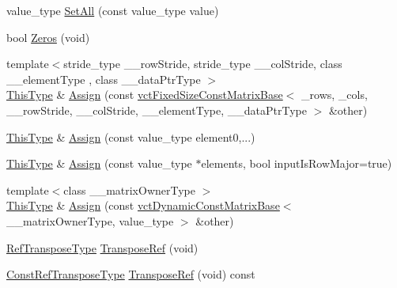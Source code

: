 \begin{DoxyCompactItemize}
\item 
value\-\_\-type \hyperlink{classvct_fixed_size_matrix_base_af32801fac5457ee53971dd5732aaaf30}{Set\-All} (const value\-\_\-type value)
\item 
bool \hyperlink{classvct_fixed_size_matrix_base_a28dd9c3f149dbd21dc91943fb51d88f0}{Zeros} (void)
\item 
{\footnotesize template$<$stride\-\_\-type \-\_\-\-\_\-row\-Stride, stride\-\_\-type \-\_\-\-\_\-col\-Stride, class \-\_\-\-\_\-element\-Type , class \-\_\-\-\_\-data\-Ptr\-Type $>$ }\\\hyperlink{classvct_fixed_size_const_matrix_base_a7ec66a96ed7e08ce9ff54093133c9d8d}{This\-Type} \& \hyperlink{classvct_fixed_size_matrix_base_a1bf6174aa97f71d7d33df7a92a368683}{Assign} (const \hyperlink{classvct_fixed_size_const_matrix_base}{vct\-Fixed\-Size\-Const\-Matrix\-Base}$<$ \-\_\-rows, \-\_\-cols, \-\_\-\-\_\-row\-Stride, \-\_\-\-\_\-col\-Stride, \-\_\-\-\_\-element\-Type, \-\_\-\-\_\-data\-Ptr\-Type $>$ \&other)
\item 
\hyperlink{classvct_fixed_size_const_matrix_base_a7ec66a96ed7e08ce9ff54093133c9d8d}{This\-Type} \& \hyperlink{classvct_fixed_size_matrix_base_a6835ab7809fcc7ff91ad04ff138ce427}{Assign} (const value\-\_\-type element0,...)
\item 
\hyperlink{classvct_fixed_size_const_matrix_base_a7ec66a96ed7e08ce9ff54093133c9d8d}{This\-Type} \& \hyperlink{classvct_fixed_size_matrix_base_a9571e59e2042cb27583c223533b2e3d7}{Assign} (const value\-\_\-type $\ast$elements, bool input\-Is\-Row\-Major=true)
\item 
{\footnotesize template$<$class \-\_\-\-\_\-matrix\-Owner\-Type $>$ }\\\hyperlink{classvct_fixed_size_const_matrix_base_a7ec66a96ed7e08ce9ff54093133c9d8d}{This\-Type} \& \hyperlink{classvct_fixed_size_matrix_base_a3c854f9f9e4153d09227eb7d57bd5c41}{Assign} (const \hyperlink{classvct_dynamic_const_matrix_base}{vct\-Dynamic\-Const\-Matrix\-Base}$<$ \-\_\-\-\_\-matrix\-Owner\-Type, value\-\_\-type $>$ \&other)
\item 
\hyperlink{classvct_fixed_size_const_matrix_base_a8d6e7ad2cf2cd82aebbc3de0d6479dbe}{Ref\-Transpose\-Type} \hyperlink{classvct_fixed_size_matrix_base_a8652991f4652d49f52c33a20e293b355}{Transpose\-Ref} (void)
\item 
\hyperlink{classvct_fixed_size_const_matrix_base_a41d41a9a3dc6d0c8e36348a8c2fc83db}{Const\-Ref\-Transpose\-Type} \hyperlink{classvct_fixed_size_matrix_base_a6189c6f8514507c6d96401cc8537c121}{Transpose\-Ref} (void) const 

\end{DoxyCompactItemize}
